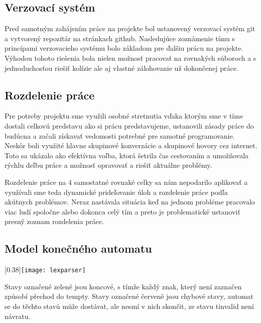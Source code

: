 \documentclass[a4paper]{article}
\begin{document}
\subsection{Verzovací systém}
Pred samotným zahájením práce na projekte bol ustanovený verzovací systém git a vytvorený repozitár na stránkach github. Nasledujúce zoznámenie tímu s princípami verzovacieho systému bolo základom pre ďalšiu prácu na projekte. Výhodou tohoto riešenia bola nielen možnosť pracovať na rovnakých súboroch a s jednoduchosťou riešiť kolízie ale aj vlastné zálohovanie už dokončenej práce.
 
\subsection{Rozdelenie práce}
Pre potreby projektu sme využili osobné stretnutia vďaka ktorým sme v tíme dostali celkovú predstavu ako si prácu predstavujeme, ustanovili zásady práce do budúcna a začali získavať vedomosti potrebné pre samotné programovanie. Neskôr boli využité hlavne skupinové konverzácie a skupinové hovory cez internet. Toto sa ukázalo ako efektívna voľba, ktorá šetrila čas cestovaním a umožňovala rýchlu deľbu práce a možnosť opravovať a riešiť aktuálne problémy.

Rozdelenie práce na 4 samostatné rovnaké celky sa nám nepodarilo aplikovať a využívali sme teda dynamické prideľovanie úloh a rozdelenie práce podľa akútnych problémov. Neraz nastávala situácia keď na jednom probléme pracovalo viac ludí spoločne alebo dokonca celý tím a preto je problematické ustanoviť presný zoznam rozdelenia práce.

\clearpage
\begin{landscape}
\section{Model konečného automatu}
\scalebox{0.40}[0.38]{\texttt{[image: lexparser]}}
\end{landscape}

Stavy označené zeleně jsou koncové, s tímže každý znak, který není zaznačen způsobí přechod do t\textunderscore empty.
Stavy označené červeně jsou chybové stavy, automat se do těchto stavů může dostávat, ale nesmí v nich skončit, ze stavu t\textunderscore invalid není návratu.
\clearpage

\newpage
\end{document}
